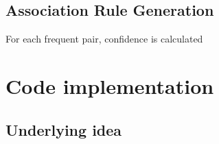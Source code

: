 \documentclass{article}
\begin{document}
\subsection{Association Rule Generation}
For each frequent pair, confidence is calculated 
\section{Code implementation}

\subsection{Underlying idea}


\subsection{}
\end{document}
